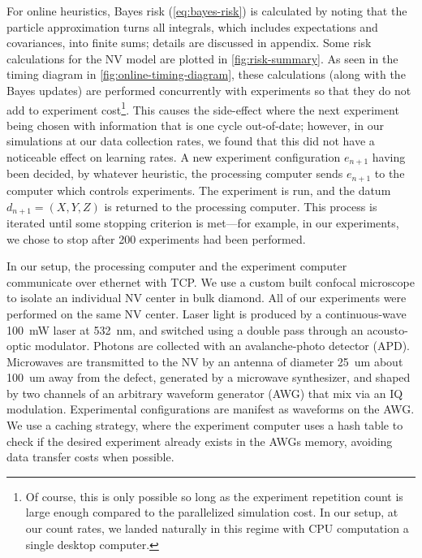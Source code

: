 \documentclass[aps,nofootinbib,twocolumn,superscriptaddress]{revtex4}
\newcommand{\eps}{e}
\newcommand{\data}{d}
\begin{document}
For online heuristics, Bayes risk (\autoref{eq:bayes-risk})
is calculated by noting that the
particle approximation turns all integrals, which includes
expectations and covariances, into finite sums;
details are discussed in appendix\TODO.
Some risk calculations for the NV model
are plotted in \autoref{fig:risk-summary}.
As seen in the timing diagram in \autoref{fig:online-timing-diagram}, these
calculations (along with the Bayes updates) are
performed concurrently with experiments so that they do not
add to experiment cost\footnote{Of course, this is only
possible so long as the experiment repetition count is large
enough compared to the parallelized simulation cost. In our setup, at
our count rates, we landed naturally in this regime with
CPU computation a single desktop computer.}.
This causes the side-effect where the next experiment being chosen with
information that is one cycle out-of-date; however,
in our simulations at our data collection rates,
we found that this did not have a noticeable
effect on learning rates.
A new experiment configuration $\eps_{n+1}$ having been
decided, by whatever heuristic,
the processing computer sends $\eps_{n+1}$ to the
computer which controls experiments.
The experiment is run, and the datum $\data_{n+1}=(X,Y,Z)$
is returned to the processing computer.
This process is iterated until some stopping criterion is met---for
example, in our experiments, we chose to
stop after 200 experiments had been performed.

In our setup, the processing computer and the experiment
computer communicate over ethernet with TCP.
We use a custom built confocal microscope to isolate an individual
NV center in bulk diamond.
All of our experiments were performed on the same NV center.
Laser light is produced by a continuous-wave \SI{100}{mW} laser
at \SI{532}{nm}, and switched using a double pass through an
acousto-optic modulator. %
Photons are collected with an avalanche-photo detector
(APD). %
Microwaves are transmitted to the NV by an antenna of
diameter \SI{25}{um} about \SI{100}{um} away from the defect,
generated by a microwave synthesizer, and shaped by two channels of
an arbitrary waveform generator (AWG) %
that mix via an IQ modulation. %
Experimental configurations are manifest as waveforms on the AWG.
We use a caching strategy, where the experiment computer
uses a hash table to check if the desired experiment already
exists in the AWGs memory, avoiding data transfer costs when possible.
\end{document}
